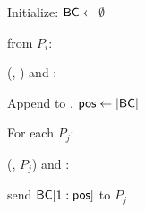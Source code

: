 \begin{bbox}[title={$\mathcal{F}_\msf{Atomic}$}]

Initialize: ${\mathsf {BC}} \leftarrow \emptyset$

\OnInput {} from $P_i$:

    \quad \Leak (, \Partyi) and \Eventually:
    
        \qquad Append  to , ${\mathsf {pos}} \leftarrow |{\mathsf {BC}}|$
        
        \qquad For each $P_j$:
            
            \qqquad \Leak (, $P_j$) and \Eventually: 

			\qqqquad send ${\mathsf {BC}}[1:{\mathsf {pos}}]$ to $P_j$
    
        
\end{bbox}
